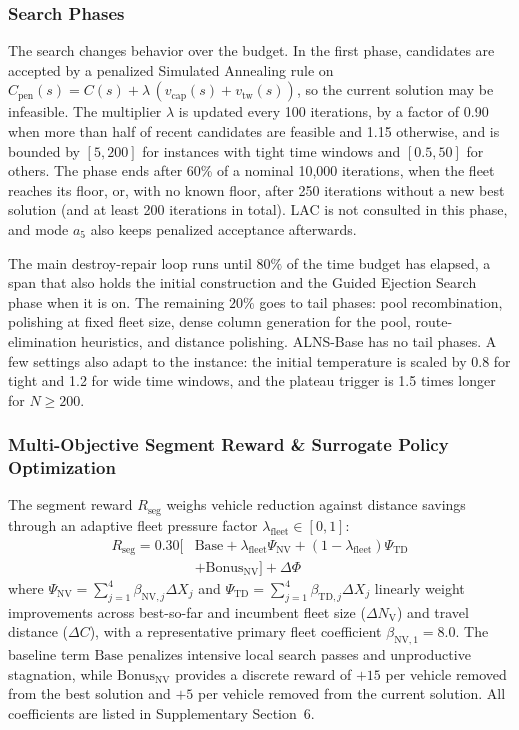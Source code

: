 \documentclass{ieeeaccess}
\newcommand{\NV}{{N_\mathrm{V}}}
\begin{document}
\subsubsection{Search Phases}
\label{sec:search_phases}
The search changes behavior over the budget. In the first phase, candidates are accepted by a penalized Simulated Annealing rule on $C_{\text{pen}}(s) = C(s) + \lambda\,(v_{\text{cap}}(s) + v_{\text{tw}}(s))$, so the current solution may be infeasible. The multiplier $\lambda$ is updated every 100 iterations, by a factor of 0.90 when more than half of recent candidates are feasible and 1.15 otherwise, and is bounded by $[5, 200]$ for instances with tight time windows and $[0.5, 50]$ for others. The phase ends after 60\% of a nominal 10,000 iterations, when the fleet reaches its floor, or, with no known floor, after 250 iterations without a new best solution (and at least 200 iterations in total). LAC is not consulted in this phase, and mode $a_5$ also keeps penalized acceptance afterwards.

The main destroy-repair loop runs until $80\%$ of the time budget has elapsed, a span that also holds the initial construction and the Guided Ejection Search phase when it is on. The remaining $20\%$ goes to tail phases: pool recombination, polishing at fixed fleet size, dense column generation for the pool, route-elimination heuristics, and distance polishing. ALNS-Base has no tail phases. A few settings also adapt to the instance: the initial temperature is scaled by 0.8 for tight and 1.2 for wide time windows, and the plateau trigger is 1.5 times longer for $N \ge 200$.

\subsubsection{Multi-Objective Segment Reward \& Surrogate Policy Optimization}
The segment reward $R_{\text{seg}}$ weighs vehicle reduction against distance savings through an adaptive fleet pressure factor $\lambda_{\text{fleet}} \in [0, 1]$:
\begin{equation}
  \begin{split}
    R_{\text{seg}} = 0.30\big[&\text{Base} + \lambda_{\text{fleet}} \Psi_{\mathrm{NV}} + (1 - \lambda_{\text{fleet}}) \Psi_{\mathrm{TD}} \\
    &+ \text{Bonus}_{\mathrm{NV}}\big] + \Delta \Phi
  \end{split}
  \label{eq:segment_reward}
\end{equation}
where $\Psi_{\mathrm{NV}} = \sum_{j=1}^4 \beta_{\mathrm{NV}, j} \Delta X_j$ and \allowbreak $\Psi_{\mathrm{TD}} = \sum_{j=1}^4 \beta_{\mathrm{TD}, j} \Delta X_j$ linearly weight improvements across best-so-far and incumbent fleet size ($\Delta\NV$) and travel distance ($\Delta C$), with a representative primary fleet coefficient $\beta_{\mathrm{NV}, 1} = 8.0$. The baseline term $\text{Base}$ penalizes intensive local search passes and unproductive stagnation, while $\text{Bonus}_{\mathrm{NV}}$ provides a discrete reward of $+15$ per vehicle removed from the best solution and $+5$ per vehicle removed from the current solution. All coefficients are listed in Supplementary Section~6.
\end{document}
